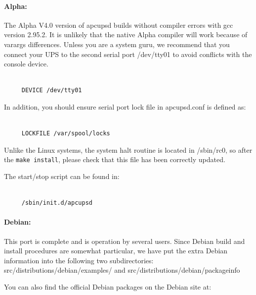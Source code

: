 \label{Alpha}

\paragraph*{Alpha:}

\label{index-Alpha-32}
\label{index-OS_002c-Alpha-33}
The Alpha V4.0 version of apcupsd builds without compiler errors with gcc
version 2.95.2. It is unlikely that the native Alpha compiler will work
because of varargs differences. Unless you are a system guru, we recommend
that you connect your UPS to the second serial port /dev/tty01 to avoid
conflicts with the console device. 

\footnotesize
\begin{verbatim}
     
     DEVICE /dev/tty01
\end{verbatim}
\normalsize

In addition, you should ensure serial port lock file in apcupsd.conf is
defined as: 

\footnotesize
\begin{verbatim}
     
     LOCKFILE /var/spool/locks
\end{verbatim}
\normalsize

Unlike the Linux systems, the system halt routine is located in /sbin/rc0, so
after the {\tt make install}, please check that this file has been correctly
updated.  

The start/stop script can be found in: 

\footnotesize
\begin{verbatim}
     
     /sbin/init.d/apcupsd
\end{verbatim}
\normalsize

\label{Debian}

\paragraph*{Debian:}

\label{index-Debian-34}
\label{index-OS_002c-Debian-35}
This port is complete and is operation by several users. Since Debian build
and install procedures are somewhat particular, we have put the extra Debian
information into the following two subdirectories:
\lt{}src\gt{}/distributions/debian/examples/ and
\lt{}src\gt{}/distributions/debian/packageinfo  

You can also find the official Debian packages on the Debian site at:  


